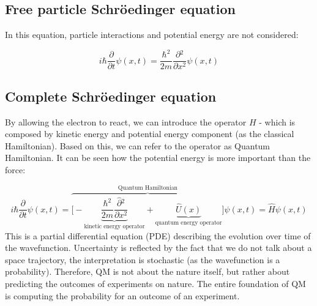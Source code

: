   \subsection{Free particle Schr\"oedinger equation}
  In this equation, particle interactions and potential energy are not considered:

  $$i\hbar \frac{\partial {}}{\partial {t}}\psi(x,t) = \frac{\hbar^2}{2m}\frac{\partial {^2}}{\partial {x^2}}\psi(x,t)$$

  \subsection{Complete Schr\"oedinger equation}
  By allowing the electron to react, we can introduce the operator $H$ - which is composed by kinetic energy and potential energy component (as the classical Hamiltonian). Based on this, we can refer to the operator as Quantum Hamiltonian.
  It can be seen how the potential energy is more important than the force:

  $$i\hbar \frac{\partial {}}{\partial {t}}\psi(x,t) = \overbrace{\biggl[-\underbrace{\frac{\hbar^2}{2m}\frac{\hat{\partial} {^2}}{\partial {x^2}}}_{\text{kinetic energy operator}}+\underbrace{\hat{U}(x)}_{\text{quantum energy operator}}\biggr]}^{\text{Quantum Hamiltonian}}\psi(x,t) = \hat{H}\psi(x,t)$$
  This is a partial differential equation (PDE) describing the evolution over time of the wavefunction. Uncertainty is reflected by the fact that we do not talk about a space trajectory, the interpretation is stochastic (as the wavefunction is a probability). Therefore, QM is not about the nature itself, but rather about predicting the outcomes of experiments on nature. The entire foundation of QM is computing the probability for an outcome of an experiment. 
